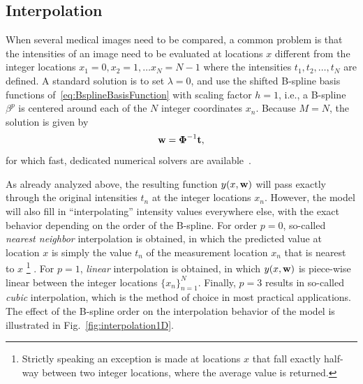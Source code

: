 \documentclass[10pt,twoside]{book}
\begin{document}
\setcounter{myFootnoteValueSaver}{\value{footnote}}


\subsection{Interpolation}

When several medical images need to be compared, a common problem is that the intensities of an image need to be evaluated at locations $x$ different from the integer locations $x_1\!=\!0, x_2\!=\!1, \ldots x_N\!=\!N\!-\!1$ where the intensities $t_1, t_2, \ldots, t_N$ are defined.  
%
A standard solution is to 
set $\lambda=0$, and
use the shifted B-spline basis functions of~\eqref{eq:BsplineBasisFunction} with scaling factor $h=1$, i.e., a B-spline $\beta^p$ is centered around each of the $N$ integer coordinates $x_n$.
%
Because $M=N$, the solution is given by%
\footnotemark[\value{myFootnoteValueSaver}]
$$
\mathbf{w} = {\mbox{\boldmath {${\Phi}$}}}^{-1} \mathbf{t}
,
$$
for which fast, dedicated numerical solvers are available~\cite{UnserSPM1999}.

As already analyzed above, the resulting function $y(x, \mathbf{w})$ will pass exactly through the original intensities $t_n$ at the integer locations $x_n$.
However, the model will also fill in ``interpolating'' intensity values everywhere else, with the exact behavior depending on the order of the B-spline. For order $p=0$, so-called \emph{nearest neighbor} interpolation is obtained, in which the predicted value at location $x$ is simply the value $t_n$ of the measurement location $x_n$ that is nearest to $x$%
\footnote{Strictly speaking an exception is made at locations $x$ that fall exactly half-way between two integer locations,
where the average value is returned.
}
.
For $p=1$, \emph{linear} interpolation is obtained, in which $y(x, \mathbf{w})$ is piece-wise linear between the 
integer locations
$\{x_n\}_{n=1}^N$.
%
Finally, $p=3$ results in so-called \emph{cubic} interpolation, which is the method of choice in most practical applications.
The effect of the B-spline order on the interpolation behavior of the model is illustrated in Fig.~\ref{fig:interpolation1D}.
\end{document}
